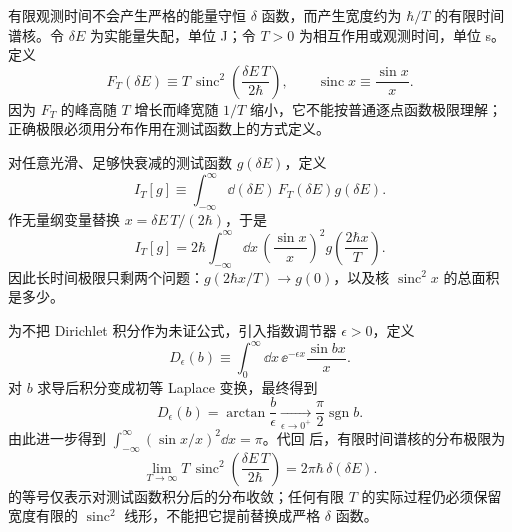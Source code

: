 
有限观测时间不会产生严格的能量守恒 $\delta$ 函数，而产生宽度约为 $\hbar/T$ 的有限时间谱核。令 $\delta E$ 为实能量失配，单位 J；令 $T>0$ 为相互作用或观测时间，单位 s。定义
\begin{equation*}
 F_T(\delta E)
 \equiv T\,\operatorname{sinc}^2\!\left(\frac{\delta E\,T}{2\hbar}\right),
 \qquad
 \operatorname{sinc}x\equiv\frac{\sin x}{x}.
\end{equation*}
因为 $F_T$ 的峰高随 $T$ 增长而峰宽随 $1/T$ 缩小，它不能按普通逐点函数极限理解；正确极限必须用分布作用在测试函数上的方式定义。

对任意光滑、足够快衰减的测试函数 $g(\delta E)$，定义
\begin{equation*}
 I_T[g]\equiv
 \int_{-\infty}^{\infty}\dd(\delta E)\,
 F_T(\delta E)g(\delta E).
\end{equation*}
作无量纲变量替换
$x=\delta E\,T/(2\hbar)$，于是
\begin{equation}
 \boxed{
 I_T[g]
 =2\hbar\int_{-\infty}^{\infty}\dd x\,
 \left(\frac{\sin x}{x}\right)^2
 g\!\left(\frac{2\hbar x}{T}\right).}
 \label{eq:sinc-test-substitution-r15}
\end{equation}
因此长时间极限只剩两个问题：$g(2\hbar x/T)\to g(0)$，以及核 $\operatorname{sinc}^2x$ 的总面积是多少。

为不把 Dirichlet 积分作为未证公式，引入指数调节器 $\epsilon>0$，定义
\begin{equation*}
 D_\epsilon(b)
 \equiv\int_0^\infty\dd x\,\ee^{-\epsilon x}\frac{\sin bx}{x}.
\end{equation*}
对 $b$ 求导后积分变成初等 Laplace 变换，最终得到
\begin{equation}
 \boxed{
 D_\epsilon(b)=\arctan\frac{b}{\epsilon}
 \xrightarrow[\epsilon\to0^+]{}
 \frac{\pi}{2}\operatorname{sgn}b.}
 \label{eq:dirichlet-integral-derived-r15}
\end{equation}
由此进一步得到
$\int_{-\infty}^{\infty}(\sin x/x)^2\dd x=\pi$。代回 后，有限时间谱核的分布极限为
\begin{equation}
 \boxed{
 \lim_{T\to\infty}
 T\,\operatorname{sinc}^2\!\left(\frac{\delta E\,T}{2\hbar}\right)
 =2\pi\hbar\,\delta(\delta E).}
 \label{eq:sinc-delta-proved-r15}
\end{equation}
 的等号仅表示对测试函数积分后的分布收敛；任何有限 $T$ 的实际过程仍必须保留宽度有限的 $\operatorname{sinc}^2$ 线形，不能把它提前替换成严格 $\delta$ 函数。
